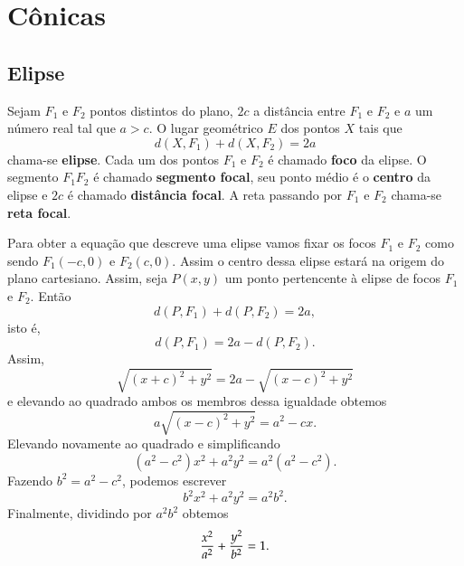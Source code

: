 
\section{C\^onicas} %
\label{sec:conicas}

\subsection{Elipse} %
\label{sub:elipse}

\begin{definicao}
  Sejam $F_1$ e $F_2$ pontos distintos do plano, $2c$ a dist\^ancia entre $F_1$ e $F_2$ e $a$ um n\'umero real tal que $a > c$. O lugar geom\'etrico $E$ dos pontos $X$ tais que
  \begin{equation}\label{definicaoelipse}
    d(X,F_1) + d(X,F_2) = 2a
  \end{equation}
  chama-se \textbf{elipse}. Cada um dos pontos $F_1$ e $F_2$ \'e chamado \textbf{foco} da elipse. O segmento $F_1F_2$ \'e chamado \textbf{segmento focal}, seu ponto m\'edio \'e o \textbf{centro} da elipse e $2c$ \'e chamado \textbf{dist\^ancia focal}. A reta passando por $F_1$ e $F_2$ chama-se \textbf{reta focal}.   
\end{definicao}

Para obter a equa\c{c}\~ao que descreve uma elipse vamos fixar os focos $F_1$ e $F_2$ como sendo $F_1(-c,0)$ e $F_2(c,0)$. Assim o centro dessa elipse estar\'a na origem do plano cartesiano. Assim, seja $P(x,y)$ um ponto pertencente \`a elipse de focos $F_1$ e $F_2$. Ent\~ao
\begin{equation}
  d(P,F_1) + d(P,F_2) = 2a,
\end{equation}
isto \'e,
\begin{equation}
  d(P,F_1) = 2a -  d(P,F_2).
\end{equation}
Assim,
\[
  \sqrt{(x + c)^2 + y^2} = 2a - \sqrt{(x - c)^2 + y^2}
\]
e elevando ao quadrado ambos os membros dessa igualdade obtemos
\[
  a\sqrt{(x - c)^2 + y^2} = a^2 - cx.
\]
Elevando novamente ao quadrado e simplificando
\[
  (a^2 - c^2)x^2 + a^2y^2 = a^2(a^2 - c^2).
\]
Fazendo $b^2 = a^2 - c^2$, podemos escrever
\[
  b^2x^2 + a^2y^2 = a^2b^2.
\]
Finalmente, dividindo por $a^2b^2$ obtemos
\begin{equation}\label{equacaoelipse}
  \dfrac{x^2}{a^2} + \dfrac{y^2}{b^2} = 1.
\end{equation}

